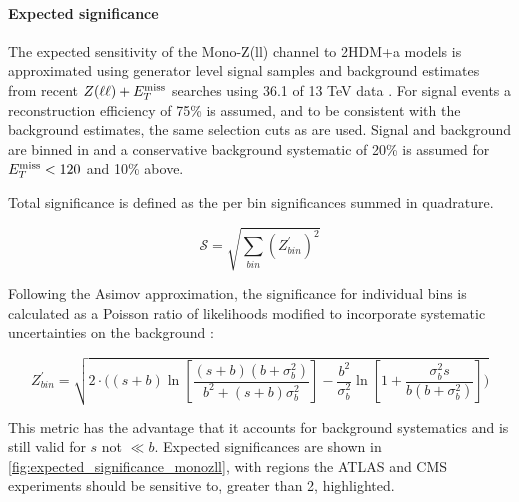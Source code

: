 















\paragraph{Expected significance}

The expected sensitivity of the Mono-Z(ll) channel to 2HDM+a models is approximated using generator level signal samples and background estimates from recent $Z(\ell \ell) + E_T^\mathrm{miss}$ searches using 36.1 \ifb of 13 TeV data \cite{Aaboud:2017bja}.  For signal events a reconstruction efficiency of 75\% is assumed, and to be consistent with the background estimates, the same selection cuts as \cite{Aaboud:2017bja} are used.  Signal and background are binned in \MET and a conservative background systematic of 20\% is assumed for $E_T^\mathrm{miss} < 120$ \GeV and 10\% above.

Total significance is defined as the per bin significances summed in quadrature.

\begin{equation}
\mathcal{S} = \sqrt{\sum_{bin} (Z^\prime_{bin})^2}
\end{equation}

Following the Asimov approximation, the significance for individual bins is calculated as a Poisson ratio of likelihoods modified to incorporate  systematic uncertainties on the background  \cite{Cowan:2012}:  

\begin{equation}
\label{eq:significance_wsyst}
Z^\prime_{bin} = \sqrt{ 2 \cdot \bigg( (s+b) \ln[\frac{ (s+b) (b+\sigma_b^2) } {b^2 + (s+b) \sigma_b^2} ]- \frac{b^2}{\sigma_b^2} \ln[1 + \frac{\sigma_b^2 s}{b(b+\sigma_b^2)} ] \bigg) }
\end{equation}

This metric has the advantage that it accounts for background systematics and is still valid for $s$ not $\ll b$.  Expected significances are shown in  \autoref{fig:expected_significance_monozll}, with regions the ATLAS and CMS experiments should be sensitive to, greater than 2, highlighted.

